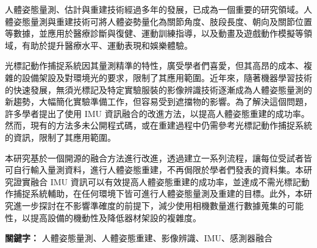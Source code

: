 \begin{abstractCH}
\fontsize{12pt}{18pt}\selectfont

人體姿態量測、估計與重建技術經過多年的發展，已成為一個重要的研究領域。人體姿態量測與重建技術可將人體姿勢量化為關節角度、肢段長度、朝向及關節位置等數據，並應用於醫療診斷與復健、運動訓練指導，以及動畫及遊戲動作模擬等領域，有助於提升醫療水平、運動表現和娛樂體驗。

光標記動作捕捉系統因其量測精準的特性，廣受學者們喜愛，但其高昂的成本、複雜的設備架設及對環境光的要求，限制了其應用範圍。近年來，隨著機器學習技術的快速發展，無須光標記及特定實驗服裝的影像辨識技術逐漸成為人體姿態量測的新趨勢，大幅簡化實驗準備工作，但容易受到遮擋物的影響。為了解決這個問題，許多學者提出了使用 IMU 資訊融合的改進方法，以提高人體姿態重建的成功率。然而，現有的方法多未公開程式碼，或在重建過程中仍需參考光標記動作捕捉系統的資訊，限制了其應用範圍。

本研究基於一個開源的融合方法進行改進，透過建立一系列流程，讓每位受試者皆可自行輸入量測資料，進行人體姿態重建，不再侷限於學者們發表的資料集。本研究證實融合 IMU 資訊可以有效提高人體姿態重建的成功率，並達成不需光標記動作捕捉系統輔助，在任何環境下皆可進行人體姿態量測及重建的目標。此外，本研究進一步探討在不影響準確度的前提下，減少使用相機數量進行數據蒐集的可能性，以提高設備的機動性及降低器材架設的複雜度。

\bigskip
\textbf{關鍵字：} 人體姿態量測、人體姿態重建、影像辨識、IMU、感測器融合

\end{abstractCH}